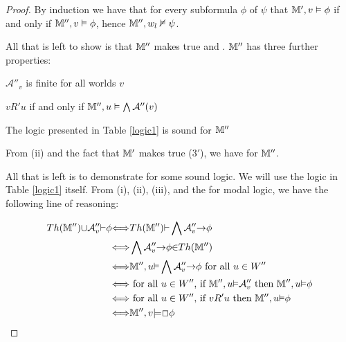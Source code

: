 \begin{proof}
  
  
  By induction we have that for every subformula $\phi$ of $\psi$ that
  $\mathbbm{M}', v \vDash \phi$ if and only if $\mathbbm{M}'', v \vDash \phi$,
  hence $\mathbbm{M}'', w_l \nvDash \psi$.
  
  
  
  All that is left to show is that $\mathbbm{M}''$ makes true 
  and .  $\mathbbm{M}''$ has three further properties:
  \begin{enumerateroman}
    \item $\mathcal{A}''_v$ is finite for all worlds $v$
    
    \item  $v R' u$ if and only if $\mathbbm{M}'', u \vDash \bigwedge
    \mathcal{A}'' (v)$
    
    \item The logic presented in Table \ref{logic1} is sound for
    $\mathbbm{M}''$
  \end{enumerateroman}
  From (ii) and the fact that $\mathbbm{M}'$ makes true (3$'$), we have
   for $\mathbbm{M}''$.
  
  
  
  All that is left is to demonstrate  for some sound logic.  We
  will use the logic in Table \ref{logic1} itself.  From (i), (ii), (iii),
  and the  for modal logic, we have the following
  line of reasoning:
  
  \begin{align*}
    Th({\mathbbm{M}}''){\cup}\mathcal{A}''_v{\vdash}{\phi} &
    {\Longleftrightarrow}Th({\mathbbm{M}}''){\vdash}\bigwedge\mathcal{A}''_v{\rightarrow}{\phi}\\
    &
    {\Longleftrightarrow}\bigwedge\mathcal{A}''_v{\rightarrow}{\phi}{\in}Th({\mathbbm{M}}'')\\
    &
    {\Longleftrightarrow}{\mathbbm{M}}'',u{\vDash}\bigwedge\mathcal{A}''_v{\rightarrow}{\phi}\text{
    for all $u \in W''$}\\
    & {\Longleftrightarrow}\text{ for all $u \in W''$, if
    }{\mathbbm{M}}'',u{\vDash}\mathcal{A}''_v\text{ then
    }{\mathbbm{M}}'',u{\vDash}{\phi}\\
    & {\Longleftrightarrow}\text{ for all $u \in W''$, if }v R 'u \text{ then
    }{\mathbbm{M}}'',u{\vDash}{\phi}\\
    & {\Longleftrightarrow}{\mathbbm{M}}'',v{\models}\Box{\phi}
  \end{align*}
\end{proof}

